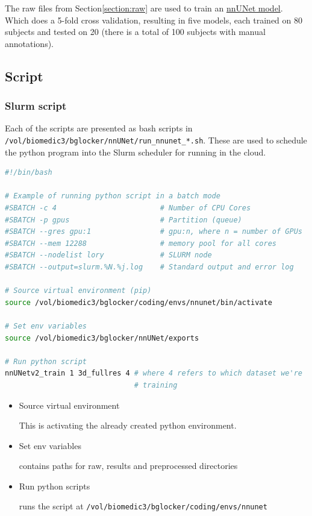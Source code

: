 \documentclass[11pt]{article}
\begin{document}
The raw files from Section\ref{section:raw} are used to train an \href{https://github.com/MIC-DKFZ/nnUNet}{nnUNet model}. Which does a 5-fold cross validation, resulting in five models, each trained on 80 subjects and tested on 20 (there is a total of 100 subjects with manual annotations).

\subsection{Script}

\subsubsection*{Slurm script}

Each of the scripts are presented as bash scripts in \texttt{/vol/biomedic3/bglocker/nnUNet/run\_nnunet\_*.sh}. These are used to schedule the python program into the Slurm scheduler for running in the cloud.

\begin{lstlisting}[language=bash]
#!/bin/bash

# Example of running python script in a batch mode
#SBATCH -c 4                        # Number of CPU Cores
#SBATCH -p gpus                     # Partition (queue)
#SBATCH --gres gpu:1                # gpu:n, where n = number of GPUs
#SBATCH --mem 12288                 # memory pool for all cores
#SBATCH --nodelist lory          	# SLURM node
#SBATCH --output=slurm.%N.%j.log    # Standard output and error log

# Source virtual environment (pip)
source /vol/biomedic3/bglocker/coding/envs/nnunet/bin/activate

# Set env variables
source /vol/biomedic3/bglocker/nnUNet/exports

# Run python script
nnUNetv2_train 1 3d_fullres 4 # where 4 refers to which dataset we're 
                              # training
\end{lstlisting}

\begin{itemize}
    \item Source virtual environment
    
    This is activating the already created python environment. 

    \item Set env variables
    
    contains paths for raw, results and preprocessed directories

    \item Run python scripts 
    
    runs the script at \texttt{/vol/biomedic3/bglocker/coding/envs/nnunet}
\end{itemize}
\end{document}
